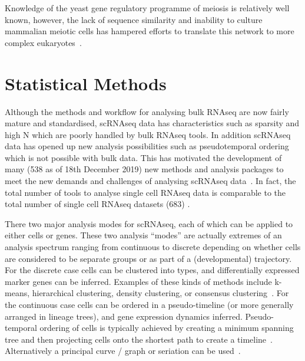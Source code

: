 Knowledge of the yeast gene regulatory programme of meiosis is relatively well known, however, the lack of sequence similarity and inability to culture mammalian meiotic cells has hampered efforts to translate this network to more complex eukaryotes~\parencite{Brar2011HighResolution,Mata2002transcriptional,Chu1998Transcriptional,Handel2010Genetics}.


\section{Statistical Methods}

Although the methods and workflow for analysing bulk RNAseq are now fairly mature and standardised, scRNAseq data has characteristics such as sparsity and high N which are poorly handled by bulk RNAseq tools. In addition scRNAseq data has opened up new analysis possibilities such as pseudotemporal ordering which is not possible with bulk data. This has motivated the development of many (538 as of 18th December 2019) new methods and analysis packages to meet the new demands and challenges of analysing scRNAseq data~\parencite{Zappia2018Exploring}. In fact, the total number of tools to analyse single cell RNAseq data is comparable to the total number of single cell RNAseq datasets (683) \parencite{Svensson2019curated}.


There two major analysis modes for scRNAseq, each of which can be applied to either cells or genes. These two analysis ``modes'' are actually extremes of an analysis spectrum ranging from continuous to discrete depending on whether cells are considered to be separate groups or as part of a (developmental) trajectory. For the discrete case cells can be clustered into types, and differentially expressed marker genes can be inferred. Examples of these kinds of methods include k-means, hierarchical clustering, density clustering, or consensus clustering~\parencite{Zurauskiene2016pcaReduce,Kiselev2017SC3,Guo2015SINCERA,Satija2015Spatial}. For the continuous case cells can be ordered in a pseudo-timeline (or more generally arranged in lineage trees), and gene expression dynamics inferred. Pseudo-temporal ordering of cells is typically achieved by creating a minimum spanning tree and then projecting cells onto the shortest path to create a timeline~\parencite{Trapnell2014dynamics,Ji2016TSCAN}. Alternatively a principal curve / graph or seriation can be used~\parencite{Marco2014Bifurcation,Qiu2017Reversed}.


